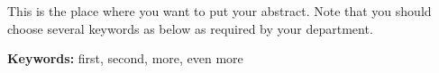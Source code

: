 This is the place where you want to put your abstract. Note that you should choose several keywords as below as required by your department.


\setlength{\hangindent}{6.5em}
\textbf{Keywords: }first, second, more, even more